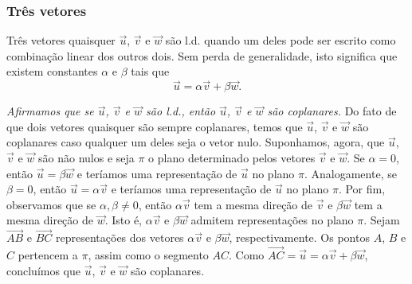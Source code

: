 \subsubsection{Três vetores}

Três vetores quaisquer $\vec{u}$, $\vec{v}$ e $\vec{w}$ são l.d. quando um deles pode ser escrito como combinação linear dos outros dois. Sem perda de generalidade, isto significa que existem constantes $\alpha$ e $\beta$ tais que
\begin{equation}
  \vec{u} = \alpha\vec{v} + \beta\vec{w}.
\end{equation}

\emph{Afirmamos que se $\vec{u}$, $\vec{v}$ e $\vec{w}$ são l.d., então $\vec{u}$, $\vec{v}$ e $\vec{w}$ são coplanares.} Do fato de que dois vetores quaisquer são sempre coplanares, temos que $\vec{u}$, $\vec{v}$ e $\vec{w}$ são coplanares caso qualquer um deles seja o vetor nulo. Suponhamos, agora, que $\vec{u}$, $\vec{v}$ e $\vec{w}$ são não nulos e seja $\pi$ o plano determinado pelos vetores $\vec{v}$ e $\vec{w}$. Se $\alpha = 0$, então $\vec{u} = \beta\vec{w}$ e teríamos uma representação de $\vec{u}$ no plano $\pi$. Analogamente, se $\beta=0$, então $\vec{u} = \alpha\vec{v}$ e teríamos uma representação de $\vec{u}$ no plano $\pi$. Por fim, observamos que se $\alpha,\beta\neq 0$, então $\alpha\vec{v}$ tem a mesma direção de $\vec{v}$ e $\beta\vec{w}$ tem a mesma direção de $\vec{w}$. Isto é, $\alpha\vec{v}$ e $\beta\vec{w}$ admitem representações no plano $\pi$. Sejam $\overrightarrow{AB}$ e $\overrightarrow{BC}$ representações dos vetores $\alpha\vec{v}$ e $\beta\vec{w}$, respectivamente. Os pontos $A$, $B$ e $C$ pertencem a $\pi$, assim como o segmento $AC$. Como $\overrightarrow{AC} = \vec{u} = \alpha\vec{v} + \beta\vec{w}$, concluímos que $\vec{u}$, $\vec{v}$ e $\vec{w}$ são coplanares.

